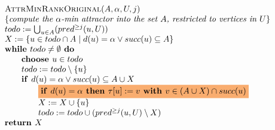 \documentclass{article}
\newcommand{\If}{\text{\textbf{if }}}
\newcommand{\Do}{\text{\textbf{ do }}}
\newcommand{\Then}{\text{\textbf{ then }}}
\newcommand{\While}{\text{\textbf{while }}}
\newcommand{\Return}{\text{\textbf{return }}}
\newcommand{\With}{\text{\textbf{ with }}}
\begin{document}
\begin{equation*}
\begin{array}{l}
\text{\textsc{AttrMinRankOriginal}}(A, \alpha, U, j) \\
\{\textit{compute the $\alpha$-min attractor into the set $A$, restricted to vertices in $U$}\}\\
todo := \bigcup_{u \in A} (%
pred^{\geq j}(u, U) ) \\
X := \{ u \in todo \cap A \mid d(u) = \alpha \vee succ(u) \subseteq A \} \\
\While todo \neq \emptyset \Do \\
\qquad \textbf{choose } u \in todo \\
\qquad todo := todo \setminus \{u\} \\
\qquad \If d(u) = \alpha \vee succ(u) \subseteq A \cup X \\
\qquad \qquad \colorbox{Apricot}{$ \If d(u) = \alpha \Then \tau
\lbrack u]:=v\With v\in (A \cup X) \cap succ(u) $}\\ 
\qquad \qquad X := X \cup \{u \} \\
\qquad \qquad todo := todo \cup (%
pred^{\geq j}(u, U) \setminus X)  \\
\Return X
\end{array}
\end{equation*}
\end{document}
